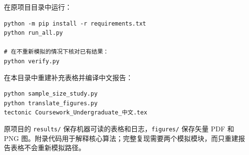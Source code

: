 \documentclass[11pt,a4paper,fontset=none]{ctexart}
\begin{document}
\noindent 在原项目目录中运行：
\begin{lstlisting}[numbers=none]
python -m pip install -r requirements.txt
python run_all.py

# 在不重新模拟的情况下核对已有结果：
python verify.py
\end{lstlisting}
\noindent 在本目录中重建补充表格并编译中文报告：
\begin{lstlisting}[numbers=none]
python sample_size_study.py
python translate_figures.py
tectonic Coursework_Undergraduate_中文.tex
\end{lstlisting}
\noindent\small 原项目的 \texttt{results/} 保存机器可读的表格和日志，\texttt{figures/} 保存矢量 PDF 和 PNG 图。附录代码用于解释核心算法；完整复现需要两个模拟模块，而只重建报告表格不会重新模拟路径。
\end{document}
